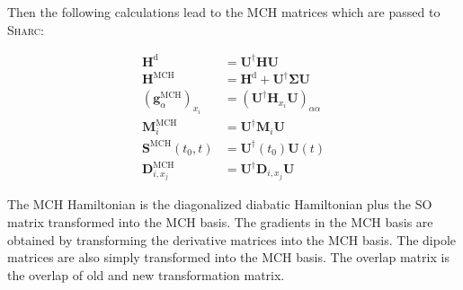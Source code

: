\documentclass[a4paper,11pt,DIV=15,openany,twoside=false]{scrbook}
\newcommand{\tthdump}[1]{#1}
\newcommand{\sharc}{\textsc{Sharc}}
\begin{document}
Then the following calculations lead to the MCH matrices which are passed to \sharc:
\tthdump{
  \begin{align}
    \mathbf{H}^{\text{d}}&=\mathbf{U}^\dagger\mathbf{H}\mathbf{U}\\
    \mathbf{H}^{\text{MCH}}&=\mathbf{H}^{\text{d}}+\mathbf{U}^\dagger\boldsymbol{\Sigma}\mathbf{U}\\
    \left(\mathbf{g}^{\text{MCH}}_\alpha\right)_{x_i}&=\left(\mathbf{U}^\dagger\mathbf{H}_{x_i}\mathbf{U}\right)_{\alpha\alpha}\\
    \mathbf{M}^{\text{MCH}}_i&=\mathbf{U}^\dagger\mathbf{M}_i\mathbf{U}\\
    \mathbf{S}^{\text{MCH}}(t_0,t)&=\mathbf{U}^\dagger(t_0)\mathbf{U}(t)\\
    \mathbf{D}^{\text{MCH}}_{i,x_j}&=\mathbf{U}^\dagger\mathbf{D}_{i,x_j}\mathbf{U}
  \end{align}
}
The MCH Hamiltonian is the diagonalized diabatic Hamiltonian plus the SO matrix transformed into the MCH basis. The gradients in the MCH basis are obtained by transforming the derivative matrices into the MCH basis. The dipole matrices are also simply transformed into the MCH basis. The overlap matrix is the overlap of old and new transformation matrix.
\end{document}
